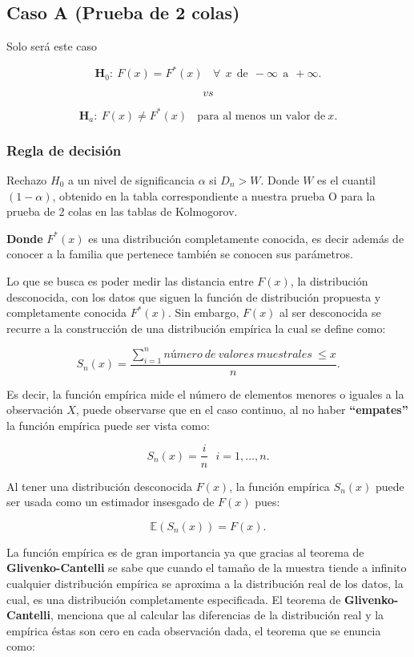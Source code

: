 \documentclass[
  a4paper,
  oneside,
  openany]{book}
\begin{document}
\hypertarget{caso-a-prueba-de-2-colas-2}{%
\subsection{Caso A (Prueba de 2 colas)}\label{caso-a-prueba-de-2-colas-2}}

Solo será este caso

\[\textbf{H}_0: \ F(x)=F^*(x) \ \ \ \ \forall \ \ x\ \  \mbox{de} \ \ -\infty \ \  \mbox{a} \ \  +\infty.\]

\[vs\]

\[\textbf{H}_a: \ F(x) \neq F^*(x) \ \ \ \ \mbox{para al menos un valor de} \  x.\]

\hypertarget{regla-de-decisiuxf3n-30}{%
\subsubsection*{Regla de decisión}\label{regla-de-decisiuxf3n-30}}


Rechazo \(H_0\) a un nivel de significancia \(\alpha\) si \(D_{n}>W\). Donde \(W\) es el cuantil \((1-\alpha)\), obtenido en la tabla correspondiente a nuestra prueba O para la prueba de 2 colas en las tablas de Kolmogorov.

\textbf{Donde} \(F^*(x)\) es una distribución completamente conocida, es decir además de conocer a la familia que pertenece también se conocen sus parámetros.

Lo que se busca es poder medir las distancia entre \(F(x)\), la distribución desconocida, con
los datos que siguen la función de distribución propuesta y completamente conocida \(F^*(x)\).
Sin embargo, \(F(x)\) al ser desconocida se recurre a la construcción de una distribución empírica
la cual se define como:

\[S_{n}(x)=\frac{ \sum_{i=1}^{n}número\ de\ valores\ muestrales\ \leq x}{n}.\]

Es decir, la función empírica mide el número de elementos menores o iguales a la observación
\(X\), puede observarse que en el caso continuo, al no haber \textbf{``empates''} la función empírica puede
ser vista como:

\[S_{n}(x)=\frac{i}{n} \ \ \ i=1,\ldots,n.\]

Al tener una distribución desconocida \(F(x)\), la función empírica \(S_{n}(x)\) puede ser usada
como un estimador insesgado de \(F(x)\) pues:

\[\mathbb{E}(S_{n}(x))=F(x).\]

La función empírica es de gran importancia ya que gracias al teorema de \textbf{Glivenko-Cantelli} se sabe que cuando el tamaño de la muestra tiende a infinito cualquier distribución empírica se aproxima a la distribución real de los datos, la cual, es una distribución completamente especificada. El teorema de \textbf{Glivenko-Cantelli}, menciona que al calcular las diferencias de la distribución real y la empírica éstas son cero en cada observación dada, el teorema que se enuncia como:
\end{document}
